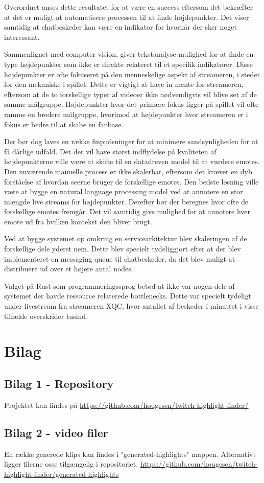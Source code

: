 \documentclass{article}
\begin{document}
Overordnet anses dette resultatet for at være en success eftersom det bekræfter at det er muligt at automatisere processen til at finde højdepunkter. Det viser samtidig at chatbeskeder kan være en indikator for hvornår der sker noget interessant.

Sammenlignet med computer vision, giver tekstanalyse mulighed for at finde en type højdepunkter som ikke er direkte relateret til et specifik indikatorer. Disse højdepunkter er ofte fokuseret på den menneskelige aspekt af streameren, i stedet for den mekaniske i spillet. Dette er vigtigt at have in mente for streameren, eftersom at de to forskellige typer af videoer ikke nødvendigvis vil blive set af de samme målgruppe. Højdepunkter hvor det primære fokus ligger på spillet vil ofte ramme en bredere målgruppe, hvorimod at højdepunkter hvor streameren er i fokus er bedre til at skabe en fanbase.

Der bør dog laves en række finpudsninger for at minimere sandsynligheden for at få dårlige udfald. Det der vil have størst indflydelse på kvaliteten af højdepunkterne ville være at skifte til en datadreven model til at vurdere emotes. Den nuværende manuelle process er ikke skalerbar, eftersom det kræver en dyb forståelse af hvordan seerne bruger de forskellige emotes. Den bedste løsning ville være at bygge en natural language processing model ved at annotere en stor mængde live streams for højdepunkter. Derefter bør der beregnes hvor ofte de forskellige emotes fremgår. Det vil samtidig give mulighed for at annotere hver emote ud fra hvilken kontekst den bliver brugt.

Ved at bygge systemet op omkring en servicearkitektur blev skaleringen af de forskellige dele yderst nem. Dette blev specielt tydeliggjort efter at der blev implementeret en messaging queue til chatbeskeder, da det blev muligt at distribuere ud over et højere antal nodes.

Valget på Rust som programmeringssprog betød at ikke var nogen dele af systemet der havde ressource relaterede bottlenecks. Dette var specielt tydeligt under livestream fra streameren XQC, hvor antallet af beskeder i minuttet i visse tilfælde overskrider tusind.





\section{Bilag}

\subsection{Bilag 1 - Repository}
Projektet kan findes på \url{https://github.com/hougesen/twitch-highlight-finder/}

\subsection{Bilag 2 - video filer}
En række generede klips kan findes i "generated-highlights" mappen. Alternativt ligger filerne osse tilgængelig i repositoriet, \url{https://github.com/hougesen/twitch-highlight-finder/generated-highlights}
\end{document}
